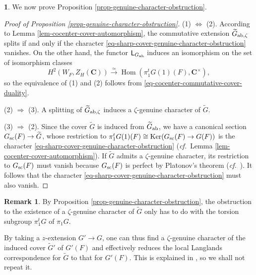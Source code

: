 \documentclass[10pt,english,reqno]{amsart}
\newcommand{\complexes}{\mathbf C}
\newcommand{\Hom}{\operatorname{Hom}}
\newcommand{\Ker}{\mathrm{Ker}}
\newcommand{\sconn}{\textnormal{sc}}
\newcommand{\abelian}{\textnormal{ab}}
\newcommand{\Langlands}{\textnormal{\textsf{L}}}
\theoremstyle{definition}
\newtheorem{rem}[subsubsection]{Remark}
\numberwithin{equation}{section}
\newtheorem{untitledsubsubsection}[subsubsection]{}
\newenvironment{void}
{\begin{untitledsubsubsection}}
{\end{untitledsubsubsection}}
\begin{document}

\begin{void}
We now prove Proposition \ref{prop-genuine-character-obstruction}.
\begin{proof}[Proof of Proposition \ref{prop-genuine-character-obstruction}]
(1) $\Leftrightarrow$ (2). According to Lemma \ref{lem-cocenter-cover-automorphism}, the commutative extension $\widetilde G_{\abelian, \zeta}$ splits if and only if the character \eqref{eq-sharp-cover-genuine-character-obstruction} vanishes. On the other hand, the functor $\Langlands_{G_{\abelian}}$ induces an isomorphism on the set of isomorphism classes
$$
H^2(W_F, Z_H(\complexes)) \xrightarrow{\simeq} \Hom(\pi_1^tG(1)(F), \complexes^{\times}),
$$
so the equivalence of (1) and (2) follows from \eqref{eq-cocenter-commutative-cover-duality}.

(2) $\Rightarrow$ (3). A splitting of $\widetilde G_{\abelian, \zeta}$ induces a $\zeta$-genuine character of $\widetilde G$.

(3) $\Rightarrow$ (2). Since the cover $\widetilde G$ is induced from $\widetilde G_{\abelian}$, we have a canonical section $G_{\sconn}(F) \rightarrow \widetilde G$, whose restriction to $\pi_1^t G(1)(F) \cong \Ker(G_{\sconn}(F) \rightarrow G(F))$ is the character \eqref{eq-sharp-cover-genuine-character-obstruction} (\emph{cf.}~Lemma \ref{lem-cocenter-cover-automorphism}). If $\widetilde G$ admits a $\zeta$-genuine character, its restriction to $G_{\sconn}(F)$ must vanish because $G_{\sconn}(F)$ is perfect by Platonov's theorem (\emph{cf.}~\cite[\S7.2]{MR1278263}). It follows that the character \eqref{eq-sharp-cover-genuine-character-obstruction} must also vanish.
\end{proof}
\end{void}


\begin{rem}
By Proposition \ref{prop-genuine-character-obstruction}, the obstruction to the existence of a $\zeta$-genuine character of $\widetilde G$ only has to do with the torsion subgroup $\pi_1^t G$ of $\pi_1 G$.

By taking a $z$-extension $G' \rightarrow G$, one can thus find a $\zeta$-genuine character of the induced cover $\widetilde G'$ of $G'(F)$ and effectively reduces the local Langlands correspondence for $\widetilde G$ to that for $G'(F)$. This is explained in \cite[Theorem 2.6.2]{kaletha2022}, so we shall not repeat it.
\end{rem}
\end{document}
